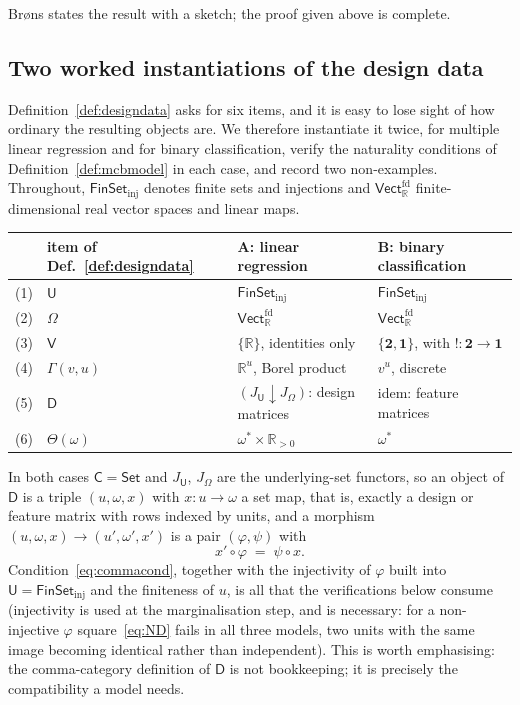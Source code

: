\documentclass[11pt,a4paper]{article}
\theoremstyle{plain}
\theoremstyle{definition}
\theoremstyle{remark}
\newcommand{\cat}[1]{\mathsf{#1}}
\newcommand{\catU}{\cat{U}}
\newcommand{\catV}{\cat{V}}
\newcommand{\catO}{\cat{\Omega}}
\newcommand{\catD}{\cat{D}}
\newcommand{\Set}{\cat{Set}}
\newcommand{\FinSet}{\cat{FinSet}}
\newcommand{\R}{\mathbb{R}}
\newcommand{\Vect}{\cat{Vect}}
\begin{document}
Br\o ns states the result with a sketch; the proof given above is complete.

\subsection{Two worked instantiations of the design data}
\label{sec:worked}

Definition~\ref{def:designdata} asks for six items, and it is easy to lose
sight of how ordinary the resulting objects are. We therefore instantiate it
twice, for multiple linear regression and for binary classification, verify
the naturality conditions of Definition~\ref{def:mcbmodel} in each case, and
record two non-examples. Throughout, $\FinSet_{\mathrm{inj}}$ denotes finite
sets and injections and $\Vect_{\R}^{\mathrm{fd}}$ finite-dimensional real
vector spaces and linear maps.

\begin{center}
\small
\begin{tabular}{@{}clll@{}}
\toprule
& item of Def.~\ref{def:designdata} & A: linear regression & B: binary classification \\
\midrule
(1) & $\catU$ & $\FinSet_{\mathrm{inj}}$ & $\FinSet_{\mathrm{inj}}$ \\
(2) & $\catO$ & $\Vect_{\R}^{\mathrm{fd}}$ & $\Vect_{\R}^{\mathrm{fd}}$ \\
(3) & $\catV$ & $\{\R\}$, identities only & $\{\mathbf{2},\mathbf{1}\}$, with
$!\colon\mathbf{2}\to\mathbf{1}$ \\
(4) & $\Gamma(v,u)$ & $\R^{u}$, Borel product & $v^{u}$, discrete \\
(5) & $\catD$ & $(J_{\catU} \downarrow J_{\catO})$: design matrices & idem: feature matrices \\
(6) & $\Theta(\omega)$ & $\omega^{*}\times\R_{>0}$ & $\omega^{*}$ \\
\bottomrule
\end{tabular}
\end{center}

In both cases $\cat{C} = \Set$ and $J_{\catU}$, $J_{\catO}$ are the
underlying-set functors, so an object of $\catD$ is a triple $(u,\omega,x)$
with $x \colon u \to \omega$ a set map, that is, exactly a design or
feature matrix with rows indexed by units, and a morphism
$(u,\omega,x)\to(u',\omega',x')$ is a pair $(\varphi,\psi)$ with
\begin{equation}\label{eq:commacond}
x' \circ \varphi \;=\; \psi \circ x .
\end{equation}
Condition~\eqref{eq:commacond}, together with the injectivity of $\varphi$
built into $\catU = \FinSet_{\mathrm{inj}}$ and the finiteness of $u$, is all
that the verifications below consume (injectivity is used at the
marginalisation step, and is necessary: for a non-injective $\varphi$
square~\eqref{eq:ND} fails in all three models, two units with the same image
becoming identical rather than independent). This is worth emphasising: the
comma-category definition
of $\catD$ is not bookkeeping; it is precisely the compatibility a model
needs.
\end{document}
